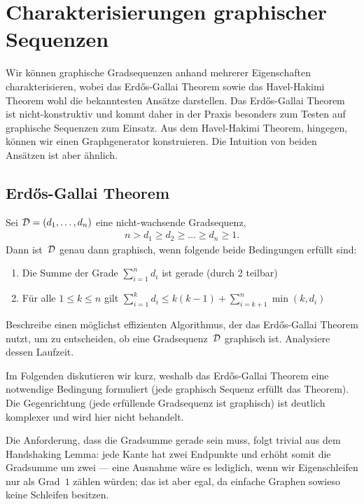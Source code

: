 \section{Charakterisierungen graphischer Sequenzen}
Wir können graphische Gradsequenzen anhand mehrerer Eigenschaften charakterisieren, wobei das Erd\H{o}s-Gallai Theorem sowie das Havel-Hakimi Theorem wohl die bekanntesten Ansätze darstellen.
Das Erd\H{o}s-Gallai Theorem ist nicht-konstruktiv und kommt daher in der Praxis besonders zum Testen auf graphische Sequenzen zum Einsatz.
Aus dem Havel-Hakimi Theorem, hingegen, können wir einen Graphgenerator konstruieren.
Die Intuition von beiden Ansätzen ist aber ähnlich.

\subsection{Erd\H{o}s-Gallai Theorem}
\begin{theorem}
    Sei $\mathcal{D} = (d_1, \ldots, d_n)$ eine nicht-wachsende Gradsequenz, \dh
    \begin{align}
        n > d_1 \ge d_2 \ge \ldots \ge d_n \ge 1.
    \end{align}
    Dann ist~$\mathcal{D}$ genau dann graphisch, wenn folgende beide Bedingungen erfüllt sind:
    \begin{enumerate}
        \item Die Summe der Grade $\sum_{i=1}^n d_i$ ist gerade (durch 2 teilbar)
        \item Für alle $1 \le k \le n$ gilt $\sum_{i=1}^k d_i \le k(k-1) + \sum_{i=k+1}^n \min(k, d_i)$\hfill\qedhere
    \end{enumerate}
\end{theorem}

\begin{exercise}
    Beschreibe einen möglichst effizienten Algorithmus, der das Erd\H{o}s-Gallai Theorem nutzt, um zu entscheiden, ob eine Gradsequenz~$\mathcal{D}$ graphisch ist.
    Analysiere dessen Laufzeit.
\end{exercise}

Im Folgenden diskutieren wir kurz, weshalb das Erd\H{o}s-Gallai Theorem eine notwendige Bedingung formuliert (\dh jede graphisch Sequenz erfüllt das Theorem).
Die Gegenrichtung (\dh jede erfüllende Gradsequenz ist graphisch) ist deutlich komplexer und wird hier nicht behandelt.

Die Anforderung, dass die Gradsumme gerade sein muss, folgt trivial aus dem Handshaking Lemma:
jede Kante hat zwei Endpunkte und erhöht somit die Gradsumme um zwei
--- eine Ausnahme wäre es lediglich, wenn wir Eigenschleifen nur als Grad~$1$ zählen würden; das ist aber egal, da einfache Graphen sowieso keine Schleifen besitzen.

